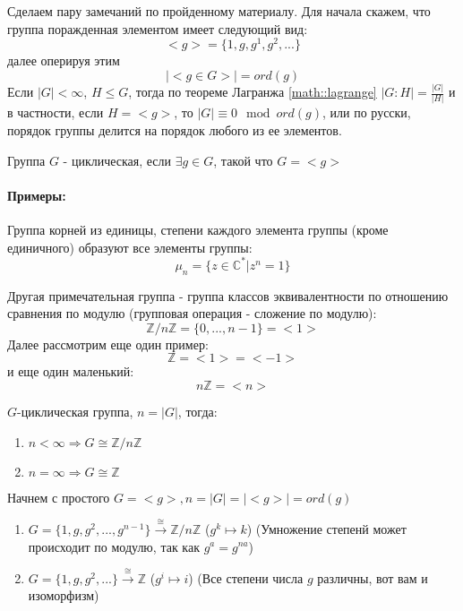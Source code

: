 Сделаем пару замечаний по пройденному материалу. Для начала скажем, что группа поражденная элементом имеет следующий вид:
\[
	<g> = \{1, g, g^1, g^2, ...\}
\]
далее оперируя этим
\[
	\left| <g \in G> \right| = ord \left(g\right)
\]
Если $\left|G\right| < \infty$, $H \le G$, тогда по теореме Лагранжа \ref{math::lagrange} $\left|G : H\right| = \frac{\left|G\right|}{\left|H\right|}$ и в частности, если $H = <g>$, то $\left|G\right| \equiv 0 \mod{ord \left( g \right)}$, или по русски, порядок группы делится на порядок любого из ее элементов.

\begin{Def}
Группа $G$ - циклическая, если $\exists g \in G$, такой что $G = <g>$
\end{Def}

\paragraph{Примеры:}

Группа корней из единицы, степени каждого элемента группы (кроме единичного) образуют все элементы группы:
\[
	\mu_n = \{z \in \mathbb{C^{*}} | z^n = 1\}
\]

Другая примечательная группа - группа классов эквивалентности по отношению сравнения по модулю (групповая операция - сложение по модулю):
\[
	\mathbb{Z} / {n\mathbb{Z}} = \{0, ..., n-1\} = <1>
\]
Далее рассмотрим еще один пример:
\[
	\mathbb{Z} = <1> = <-1>
\]
и еще один маленький:
\[
	n\mathbb{Z} = <n>
\]

\begin{Th}
$G$-циклическая группа, $n=\left|G\right|$, тогда:
\begin{enumerate}
\item $n < \infty \Rightarrow G \cong \mathbb{Z} / {n \mathbb{Z}}$

\item $n = \infty \Rightarrow G \cong \mathbb{Z}$
\end{enumerate}
\end{Th}

\begin{Proof}
Начнем с простого $G = <g>, n = \left|G\right| = \left|<g>\right| = ord \left(g\right)$
\begin{enumerate}
\item $G = \{1, g, g^2, ..., g^{n-1}\} \xrightarrow{\cong} \mathbb{Z}/{n\mathbb{Z}}$ ($g^k \mapsto k$) (Умножение степенй может происходит по модулю, так как $g^a = g^{na}$)

\item $G = \{1, g, g^2, ... \} \xrightarrow{\cong} \mathbb{Z}$ ($g^i \mapsto i$) (Все степени числа $g$ различны, вот вам и изоморфизм)
\end{enumerate}
\end{Proof}

